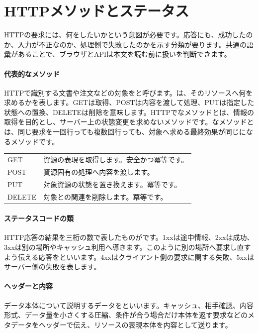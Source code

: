 \section{HTTPメソッドとステータス}
\label{sec:05-network-15}

HTTPの要求には、何をしたいかという意図が必要です。応答にも、成功したのか、入力が不正なのか、処理側で失敗したのかを示す分類が要ります。共通の語彙があることで、ブラウザとAPIは本文を読む前に扱いを判断できます。

\begingroup
\begingroup
\paragraph{代表的なメソッド}
        HTTPで識別する文書や注文などの対象をと呼びます。は、そのリソースへ何を求めるかを表します。GETは取得、POSTは内容を渡して処理、PUTは指定した状態への置換、DELETEは削除を意味します。HTTPでなメソッドとは、情報の取得を目的とし、サーバー上の状態変更を求めないメソッドです。なメソッドとは、同じ要求を一回行っても複数回行っても、対象へ求める最終効果が同じになるメソッドです。
        \begin{tabularx}{\linewidth}{@{}lY@{}}
          \toprule
          GET & 資源の表現を取得します。安全かつ冪等です。\\
          POST & 資源固有の処理へ内容を渡します。\\
          PUT & 対象資源の状態を置き換えます。冪等です。\\
          DELETE & 対象との関連を削除します。冪等です。\\
          \bottomrule
        \end{tabularx}

\par
\endgroup
\medskip
\begingroup
\paragraph{ステータスコードの類}
        HTTP応答の結果を三桁の数で表したものがです。1xxは途中情報、2xxは成功、3xxは別の場所やキャッシュ利用へ導きます。このように別の場所へ要求し直すよう伝える応答をといいます。4xxはクライアント側の要求に関する失敗、5xxはサーバー側の失敗を表します。

\paragraph{ヘッダーと内容}
        データ本体について説明するデータをといいます。キャッシュ、相手確認、内容形式、データ量を小さくする圧縮、条件が合う場合だけ本体を返す要求などのメタデータをヘッダーで伝え、リソースの表現本体を内容として送ります。


